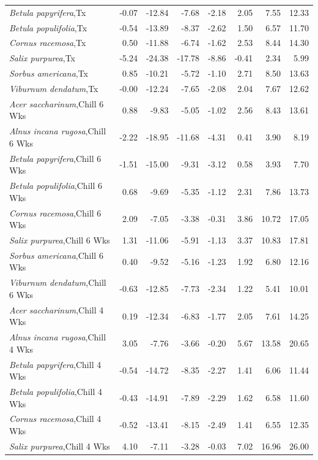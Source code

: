 \documentclass{article}\usepackage[]{graphicx}\usepackage[]{color}
\begin{document}
\begin{longtable}{lrrrrrrr}
  \textit{Betula papyrifera},Tx & -0.07 & -12.84 & -7.68 & -2.18 & 2.05 & 7.55 & 12.33 \\ 
  \textit{Betula populifolia},Tx & -0.54 & -13.89 & -8.37 & -2.62 & 1.50 & 6.57 & 11.70 \\ 
  \textit{Cornus racemosa},Tx & 0.50 & -11.88 & -6.74 & -1.62 & 2.53 & 8.44 & 14.30 \\ 
  \textit{Salix purpurea},Tx & -5.24 & -24.38 & -17.78 & -8.86 & -0.41 & 2.34 & 5.99 \\ 
  \textit{Sorbus americana},Tx & 0.85 & -10.21 & -5.72 & -1.10 & 2.71 & 8.50 & 13.63 \\ 
  \textit{Viburnum dendatum},Tx & -0.00 & -12.24 & -7.65 & -2.08 & 2.04 & 7.67 & 12.62 \\ 
  \textit{Acer saccharinum},Chill 6 Wks & 0.88 & -9.83 & -5.05 & -1.02 & 2.56 & 8.43 & 13.61 \\ 
  \textit{Alnus incana rugosa},Chill 6 Wks & -2.22 & -18.95 & -11.68 & -4.31 & 0.41 & 3.90 & 8.19 \\ 
  \textit{Betula papyrifera},Chill 6 Wks & -1.51 & -15.00 & -9.31 & -3.12 & 0.58 & 3.93 & 7.70 \\ 
  \textit{Betula populifolia},Chill 6 Wks & 0.68 & -9.69 & -5.35 & -1.12 & 2.31 & 7.86 & 13.73 \\ 
  \textit{Cornus racemosa},Chill 6 Wks & 2.09 & -7.05 & -3.38 & -0.31 & 3.86 & 10.72 & 17.05 \\ 
  \textit{Salix purpurea},Chill 6 Wks & 1.31 & -11.06 & -5.91 & -1.13 & 3.37 & 10.83 & 17.81 \\ 
  \textit{Sorbus americana},Chill 6 Wks & 0.40 & -9.52 & -5.16 & -1.23 & 1.92 & 6.80 & 12.16 \\ 
  \textit{Viburnum dendatum},Chill 6 Wks & -0.63 & -12.85 & -7.73 & -2.34 & 1.22 & 5.41 & 10.01 \\ 
  \textit{Acer saccharinum},Chill 4 Wks & 0.19 & -12.34 & -6.83 & -1.77 & 2.05 & 7.61 & 14.25 \\ 
  \textit{Alnus incana rugosa},Chill 4 Wks & 3.05 & -7.76 & -3.66 & -0.20 & 5.67 & 13.58 & 20.65 \\ 
  \textit{Betula papyrifera},Chill 4 Wks & -0.54 & -14.72 & -8.35 & -2.27 & 1.41 & 6.06 & 11.44 \\ 
  \textit{Betula populifolia},Chill 4 Wks & -0.43 & -14.91 & -7.89 & -2.29 & 1.62 & 6.58 & 11.60 \\ 
  \textit{Cornus racemosa},Chill 4 Wks & -0.52 & -13.41 & -8.15 & -2.49 & 1.41 & 6.55 & 12.35 \\ 
  \textit{Salix purpurea},Chill 4 Wks & 4.10 & -7.11 & -3.28 & -0.03 & 7.02 & 16.96 & 26.00 \\ 

\end{longtable}
\end{document}
